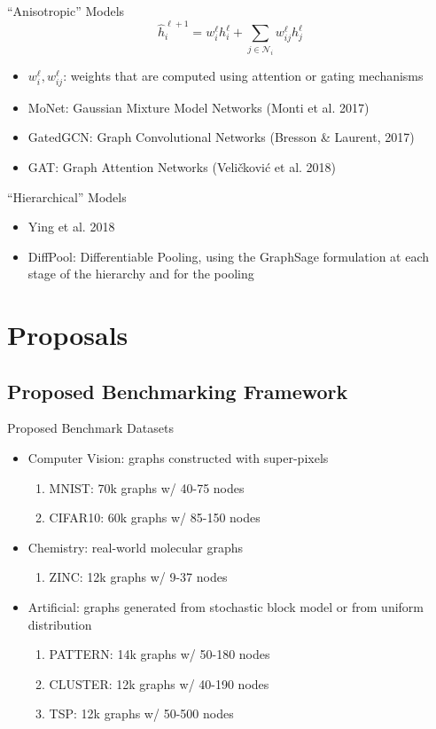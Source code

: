 \documentclass{beamer}
\begin{document}
\begin{frame}{``Anisotropic'' Models}
\[
\hat{h}_i^{\ell+1}=w_i^\ell h_i^\ell+\sum_{j\in\mathcal{N}_i}w_{ij}^\ell h_j^\ell
\]
\begin{itemize}
\item $w_i^\ell,w_{ij}^\ell$: weights that are computed using attention or gating mechanisms
\item MoNet: Gaussian Mixture Model Networks (Monti et al. 2017)
\item GatedGCN: Graph Convolutional Networks (Bresson \& Laurent, 2017)
\item GAT: Graph Attention Networks (Veli\v{c}kovi\'{c} et al. 2018)
\end{itemize}
\end{frame}


\begin{frame}{``Hierarchical'' Models}
\begin{itemize}
\item Ying et al. 2018
\item DiffPool: Differentiable Pooling, using the GraphSage formulation at each stage of the hierarchy and for the pooling
\end{itemize}
\end{frame}


\section{Proposals}
\subsection{Proposed Benchmarking Framework}
\begin{frame}{Proposed Benchmark Datasets}
\begin{itemize}
\item Computer Vision: graphs constructed with super-pixels
\begin{enumerate}
\item MNIST: 70k graphs w/ 40-75 nodes
\item CIFAR10: 60k graphs w/ 85-150 nodes
\end{enumerate}
\item Chemistry: real-world molecular graphs
\begin{enumerate}
\item ZINC: 12k graphs w/ 9-37 nodes
\end{enumerate}
\item Artificial: graphs generated from stochastic block model or from uniform distribution
\begin{enumerate}
\item PATTERN: 14k graphs w/ 50-180 nodes
\item CLUSTER: 12k graphs w/ 40-190 nodes
\item TSP: 12k graphs w/ 50-500 nodes
\end{enumerate}
\end{itemize}
\end{frame}
\end{document}
